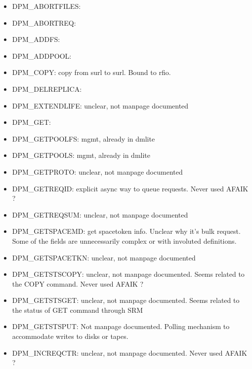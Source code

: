 \documentclass[a4paper,10pt]{scrreprt}
\begin{document}
\begin{itemize}
\item DPM\_ABORTFILES:

\item DPM\_ABORTREQ:

\item DPM\_ADDFS:

\item DPM\_ADDPOOL:

\item DPM\_COPY: copy from surl to surl. Bound to rfio.

\item DPM\_DELREPLICA:

\item DPM\_EXTENDLIFE: unclear, not manpage documented

\item DPM\_GET:

\item DPM\_GETPOOLFS: mgmt, already in dmlite

\item DPM\_GETPOOLS: mgmt, already in dmlite

\item DPM\_GETPROTO: unclear, not manpage documented

\item DPM\_GETREQID: explicit async way to queue requests. Never used AFAIK ?

\item DPM\_GETREQSUM:  unclear, not manpage documented

\item DPM\_GETSPACEMD: get spacetoken info. Unclear why it's bulk request. Some of the fields are unnecessarily complex or with involuted definitions.

\item DPM\_GETSPACETKN: unclear, not manpage documented

\item DPM\_GETSTSCOPY:  unclear, not manpage documented. Seems related to the COPY command. Never used AFAIK ?

\item DPM\_GETSTSGET: unclear, not manpage documented. Seems related to the status of GET command through SRM

\item DPM\_GETSTSPUT: Not manpage documented. Polling mechanism to accommodate writes to disks or tapes. 

\item DPM\_INCREQCTR: unclear, not manpage documented. Never used AFAIK ?


\end{itemize}
\end{document}
